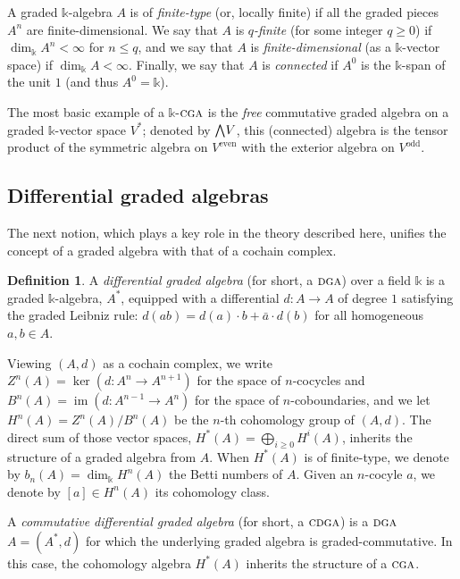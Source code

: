 \documentclass{article}
\numberwithin{equation}{section}
\theoremstyle{definition}
\newtheorem{definition}[theorem]{Definition}
\renewcommand{\k}{\mathbb{k}}
\newcommand{\dga}{\ensuremath{\textsc{dga}}}
\newcommand{\cga}{\ensuremath{\textsc{cga}}}
\newcommand{\cdga}{\ensuremath{\textsc{cdga}}}
\DeclareMathOperator{\im}{im}
\newcommand{\bwedge}{\mbox{\normalsize $\bigwedge$}}
\begin{document}
A graded $\k$-algebra $A$ is of {\em finite-type} (or, locally finite) 
if all the graded pieces $A^n$ are finite-dimensional. We say 
that $A$ is {\em $q$-finite} (for some integer $q\ge 0$) if 
$\dim_{\k} A^n<\infty$ for $n \le q$, and we say that $A$ is 
{\em finite-dimensional}\/ (as a $\k$-vector space) if 
$\dim_{\k} A<\infty$. Finally, we say that $A$ is 
{\em connected}\/ if $A^0$ is the $\k$-span of the unit $1$ 
(and thus $A^0=\k$). 

The most basic example of a $\k$-$\cga$ is the {\em free}\/ 
commutative graded algebra on a graded $\k$-vector space $V^*$; 
denoted by $\bwedge V$, this (connected) algebra is 
the tensor product of the symmetric algebra on $V^{\mathrm{even}}$ 
with the exterior algebra on $V^{\mathrm{odd}}$.

\subsection{Differential graded algebras}
\label{subsec:dgas}
The next notion, which plays a key role in the theory described here, 
unifies the concept of a graded algebra with that of a cochain complex.

\begin{definition}
\label{def:dga}
A {\em differential graded algebra}\/ (for short, a $\dga$) over 
a field $\k$ is a graded $\k$-algebra, $A^*$, equipped with a 
differential $d\colon A\rightarrow A$ of degree $1$ satisfying  
the graded Leibniz rule: $d(ab)=d(a)\cdot b+\bar{a}\cdot d(b)$ 
for all homogeneous $a, b\in A$. 
\end{definition}

Viewing $(A,d)$ as a cochain complex, we write 
$Z^n(A)= \ker (d\colon A^n \to A^{n+1})$ for the space 
of $n$-cocycles and $B^n(A)= \im (d\colon A^{n-1} \to A^n)$ 
for the space of $n$-coboundaries, and we let 
$H^n(A)=Z^n(A)/B^n(A)$ be the $n$-th cohomology group 
of $(A,d)$.  The direct sum of those vector spaces, 
$H^{*}(A)=\bigoplus_{i\ge 0} H^i(A)$, 
inherits the structure of a graded algebra from $A$.  When 
$H^*(A)$ is of finite-type, we denote by $b_n(A)=\dim_{\k} H^n(A)$ 
the Betti numbers of $A$. Given an $n$-cocyle $a$, we 
denote by $[a]\in H^n(A)$ its cohomology class.

A {\em commutative differential graded algebra}\/ (for short, a $\cdga$) 
is a $\dga$ $A=(A^*,d)$ for which the underlying graded 
algebra is graded-commutative. In this case, the cohomology 
algebra $H^*(A)$ inherits the structure of a $\cga$.
\end{document}
